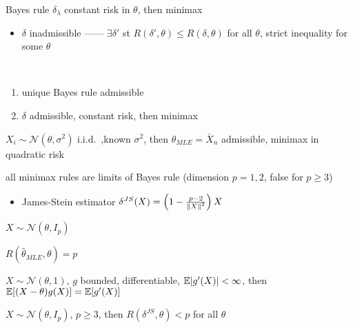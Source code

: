 \begin{cor}
    Bayes rule $\delta_\lambda$ constant risk in $\theta$, then minimax
\end{cor}

\begin{itemize}
    \item $\delta$ inadmissible ------ $\exists \delta'$ st $R(\delta', \theta) \leq R(\delta, \theta)$ for all $\theta$, strict inequality for some $\theta$
\end{itemize}

\begin{prop}\,
    \begin{enumerate}
        \item unique Bayes rule admissible
        \item $\delta$ admissible, constant risk, then minimax
    \end{enumerate}
\end{prop}

\begin{prop}
    $X_i \sim \mathcal{N}(\theta, \sigma^2)$ i.i.d.\ ,known $\sigma^2$, then $\theta_{MLE} = \bar{X}_n$ admissible, minimax in quadratic risk
\end{prop}

\begin{fact}
    all minimax rules are limits of Bayes rule (dimension $p = 1,2$, false for $p \geq 3$)
\end{fact}

\begin{itemize}
    \item James-Stein estimator $\delta^{JS}(X) = \left( 1 - \frac{p-2}{\left\lVert X\right\rVert^2} \right)X$
\end{itemize}

\begin{setting}
    $X \sim \mathcal{N}(\theta, I_p)$
\end{setting}

\begin{fact}
    $R(\hat\theta_{MLE}, \theta) = p$
\end{fact}

\begin{lemma}
    $X \sim \mathcal{N}(\theta, 1)$, $g$ bounded, differentiable, $\mathbb{E} |g'(X)| < \infty$, then\\
    $\mathbb{E}[(X - \theta)g(X)] = \mathbb{E}[g'(X)]$
\end{lemma}

\begin{prop}
    $X \sim \mathcal{N}(\theta, I_p)$, $p \geq 3$, then $R(\delta^{JS}, \theta) < p$ for all $\theta$
\end{prop}

